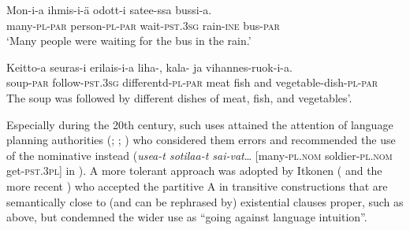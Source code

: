 \documentclass[output=paper]{LSP/langsci}
\begin{document}
\ea\label{15-hu-ex:6}
\gll Mon-i-a ihmis-i-ä odott-i satee-ssa bussi-a.\\
many-\textsc{pl}-\textsc{par} person-\textsc{pl}-\textsc{par} wait-\textsc{pst}.\textsc{3sg} rain-\textsc{ine} bus-\textsc{par}\\
\glt ‘Many people were waiting for the bus in the rain.’
\z

\ea\label{15-hu-ex:7}
\gll Keitto-a seuras-i erilais-i-a liha-, kala- ja vihannes-ruok-i-a.\\
soup-\textsc{par} follow-\textsc{pst}.\textsc{3sg} differentd-\textsc{pl}-\textsc{par} meat fish and vegetable-dish-\textsc{pl}-\textsc{par}\\
\glt The soup was followed by different dishes of meat, fish, and vegetables’. \citep{Ikola1972Partitiivi}
\z

Especially during the 20th century, such uses attained the attention of language planning authorities (\eg \citealt{Saarimaa1967Kielenopas}; \citealt{Ikola1972Partitiivi}; \citeyear[139]{Ikola1986Nykysuomen}) who considered them errors and recommended the use of the nominative instead (\eg \textit{usea-t sotilaa-t sai-vat}… [many-\textsc{pl}.\textsc{nom} soldier-\textsc{pl}.\textsc{nom} get-\textsc{pst}.\textsc{3pl}] in ). A more tolerant approach was adopted by Itkonen ( and the more recent \citealt{Itkonenetal2007Uusi}) who accepted the partitive A in transitive constructions that are semantically close to (and can be rephrased by) existential clauses proper, such as  above, but condemned the wider use as “going against language intuition”. 
\end{document}
